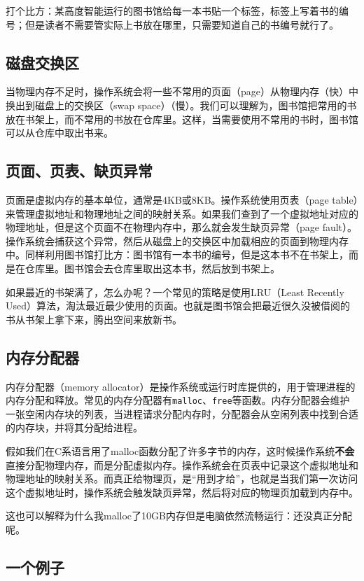 \documentclass[../main.tex]{subfiles}
\begin{document}
打个比方：某高度智能运行的图书馆给每一本书贴一个标签，标签上写着书的编号；但是读者不需要管实际上书放在哪里，只需要知道自己的书编号就行了。

\subsection{磁盘交换区}

当物理内存不足时，操作系统会将一些不常用的页面（page）从物理内存（快）中换出到磁盘上的交换区（swap space）（慢）。我们可以理解为，图书馆把常用的书放在书架上，而不常用的书放在仓库里。这样，当需要使用不常用的书时，图书馆可以从仓库中取出书来。

\subsection{页面、页表、缺页异常}

页面是虚拟内存的基本单位，通常是4KB或8KB。操作系统使用页表（page table）来管理虚拟地址和物理地址之间的映射关系。如果我们查到了一个虚拟地址对应的物理地址，但是这个页面不在物理内存中，那么就会发生缺页异常（page fault）。操作系统会捕获这个异常，然后从磁盘上的交换区中加载相应的页面到物理内存中。同样利用图书馆打比方：图书馆有一本书的编号，但是这本书不在书架上，而是在仓库里。图书馆会去仓库里取出这本书，然后放到书架上。

如果最近的书架满了，怎么办呢？一个常见的策略是使用LRU（Least Recently Used）算法，淘汰最近最少使用的页面。也就是图书馆会把最近很久没被借阅的书从书架上拿下来，腾出空间来放新书。

\subsection{内存分配器}

内存分配器（memory allocator）是操作系统或运行时库提供的，用于管理进程的内存分配和释放。常见的内存分配器有\texttt{malloc}、\texttt{free}等函数。内存分配器会维护一张空闲内存块的列表，当进程请求分配内存时，分配器会从空闲列表中找到合适的内存块，并将其分配给进程。

假如我们在C系语言用了malloc函数分配了许多字节的内存，这时候操作系统\textbf{不会}直接分配物理内存，而是分配虚拟内存。操作系统会在页表中记录这个虚拟地址和物理地址的映射关系。而真正给物理页，是“用到才给”，也就是当我们第一次访问这个虚拟地址时，操作系统会触发缺页异常，然后将对应的物理页加载到内存中。

这也可以解释为什么我malloc了10GB内存但是电脑依然流畅运行：还没真正分配呢。

\subsection{一个例子}
\end{document}
